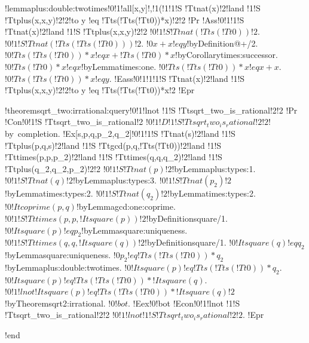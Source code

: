 !lemma{plus:double:twotimes}{!0!1!all[x,y]!,!1(!1!1!S !Tt{nat}(x)!2!land !1!S !Tt{plus}(x,x,y)!2!2!to y !eq !Tt{s}(!Tt{s}(!Tt{0}))*x)!2!2}
!Pr{
!Ass{!0!1!1!S !Tt{nat}(x)!2!land !1!S !Tt{plus}(x,x,y)!2!2}
$!0!1!S !Tt{nat}(!Tt{s}(!Tt{0}))!2$.
$!0!1!S !Tt{nat}(!Tt{s}(!Tt{s}(!Tt{0})))!2$.
$!0x+x !eq y$!by{Definition}{@+/2}.
$!0!Tt{s}(!Tt{s}(!Tt{0}))*x !eq x+!Tt{s}(!Tt{0})*x$!by{Corollary}{times:successor}.
$!0!Tt{s}(!Tt{0})*x !eq x$!by{Lemma}{times:one}.
$!0!Tt{s}(!Tt{s}(!Tt{0}))*x !eq x+x$.
$!0!Tt{s}(!Tt{s}(!Tt{0}))*x !eq y$.
!Eass{!0!1!1!1!S !Tt{nat}(x)!2!land !1!S !Tt{plus}(x,x,y)!2!2!to y !eq !Tt{s}(!Tt{s}(!Tt{0}))*x!2}}
!Epr

!theorem{sqrt_two:irrational:query}{!0!1!lnot !1!S !Tt{sqrt_two_is_rational}!2!2}
!Pr{
!Con{!0!1!S !Tt{sqrt_two_is_rational}!2}
$!0!1!D !1!S !Tt{sqrt_two_is_rational}!2!2$! by~completion.
!Ex[s,p,q,p_2,q_2]{!0!1!1!S !Tt{nat}(s)!2!land !1!S !Tt{plus}(p,q,s)!2!land !1!S !Tt{gcd}(p,q,!Tt{s}(!Tt{0}))!2!land !1!S !Tt{times}(p,p,p_2)!2!land !1!S !Tt{times}(q,q,q_2)!2!land !1!S !Tt{plus}(q_2,q_2,p_2)!2!2}
$!0!1!S !Tt{nat}(p)!2$!by{Lemma}{plus:types:1}.
$!0!1!S !Tt{nat}(q)!2$!by{Lemma}{plus:types:3}.
$!0!1!S !Tt{nat}(p_2)!2$!by{Lemma}{times:types:2}.
$!0!1!S !Tt{nat}(q_2)!2$!by{Lemma}{times:types:2}.
$!0!It{coprime}(p,q)$!by{Lemma}{gcd:one:coprime}.
$!0!1!S !Tt{times}(p,p,!It{square}(p))!2$!by{Definition}{square/1}.
$!0!It{square}(p) !eq p_2$!by{Lemma}{square:uniqueness}.
$!0!1!S !Tt{times}(q,q,!It{square}(q))!2$!by{Definition}{square/1}.
$!0!It{square}(q) !eq q_2$!by{Lemma}{square:uniqueness}.
$!0p_2 !eq !Tt{s}(!Tt{s}(!Tt{0}))*q_2$!by{Lemma}{plus:double:twotimes}.
$!0!It{square}(p) !eq !Tt{s}(!Tt{s}(!Tt{0}))*q_2$.
$!0!It{square}(p) !eq !Tt{s}(!Tt{s}(!Tt{0}))*!It{square}(q)$.
$!0!1!lnot !It{square}(p) !eq !Tt{s}(!Tt{s}(!Tt{0}))*!It{square}(q)!2$!by{Theorem}{sqrt2:irrational}.
$!0!bot$.
!Eex{!0!bot}
!Econ{!0!1!lnot !1!S !Tt{sqrt_two_is_rational}!2!2}
$!0!1!lnot !1!S !Tt{sqrt_two_is_rational}!2!2$.}
!Epr

!end
